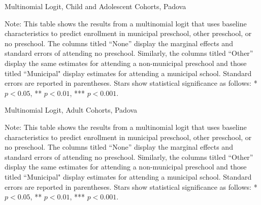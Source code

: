 \begin{table}[H] 
\centering
\caption{Multinomial Logit, Child and Adolescent Cohorts, Padova} \label{mlogit-chi-ado-PD}
\begin{adjustbox}{width=\textwidth}
\begin{threeparttable}

\begin{tablenotes}
\footnotesize\raggedright{Note: This table shows the results from a multinomial logit that uses baseline characteristics to predict enrollment in municipal preschool, other preschool, or no preschool. The columns titled ``None'' display the marginal effects and standard errors of attending no preschool. Similarly, the columns titled ``Other'' display the same estimates for attending a non-municipal preschool and those titled ``Municipal" display estimates for attending a municipal school. Standard errors are reported in parentheses. Stars show statistical significance as follows: * $p < 0.05$, ** $p < 0.01$, *** $p < 0.001$.}
\end{tablenotes}
\end{threeparttable}
\end{adjustbox}
\end{table}


\begin{table}[H] 
\centering
\caption{Multinomial Logit, Adult Cohorts, Padova} \label{mlogit-adult-PD}
\begin{threeparttable}

\begin{tablenotes}
\footnotesize\raggedright{Note: This table shows the results from a multinomial logit that uses baseline characteristics to predict enrollment in municipal preschool, other preschool, or no preschool. The columns titled ``None'' display the marginal effects and standard errors of attending no preschool. Similarly, the columns titled ``Other'' display the same estimates for attending a non-municipal preschool and those titled ``Municipal" display estimates for attending a municipal school. Standard errors are reported in parentheses. Stars show statistical significance as follows: * $p < 0.05$, ** $p < 0.01$, *** $p < 0.001$.}
\end{tablenotes}
\end{threeparttable}
\end{table}
